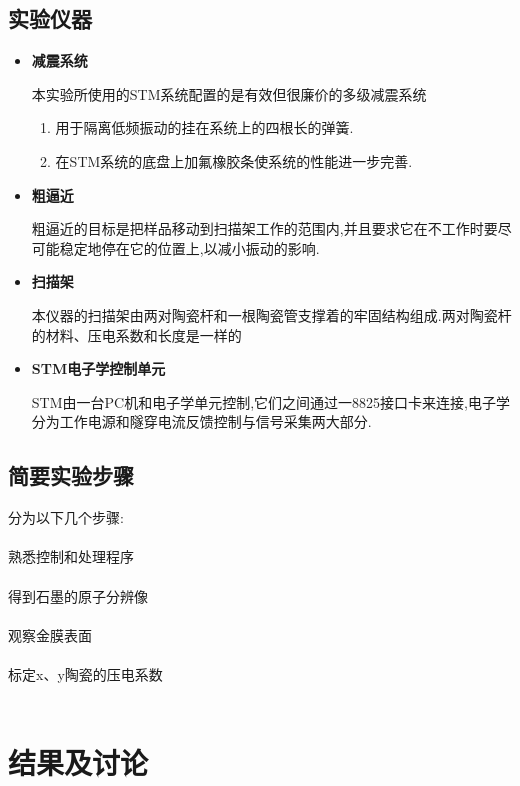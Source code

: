 \documentclass[a4paper]{article}
\begin{document}
\subsection{实验仪器}\label{sub:instruments}
\begin{itemize}
\item{\textbf{减震系统}}

本实验所使用的STM系统配置的是有效但很廉价的多级减震系统
\begin{enumerate}[(1)]
    \item 用于隔离低频振动的挂在系统上的四根长的弹簧.
    \item 在STM系统的底盘上加氟橡胶条使系统的性能进一步完善.
\end{enumerate}
\item{\textbf{粗逼近}}

粗逼近的目标是把样品移动到扫描架工作的范围内,并且要求它在不工作时要尽可能稳定地停在它的位置上,以减小振动的影响.
\item{\textbf{扫描架}}

本仪器的扫描架由两对陶瓷杆和一根陶瓷管支撑着的牢固结构组成.两对陶瓷杆的材料、压电系数和长度是一样的
\item{\textbf{STM电子学控制单元}}

STM由一台PC机和电子学单元控制,它们之间通过一8825接口卡来连接,电子学分为工作电源和隧穿电流反馈控制与信号采集两大部分.

\end{itemize}

\subsection{简要实验步骤}\label{sub:ExperimentalSteps}
分为以下几个步骤:\\\\
熟悉控制和处理程序\\\\
得到石墨的原子分辨像\\\\
观察金膜表面\\\\
标定x、y陶瓷的压电系数\\\\

\newpage
\section{结果及讨论}
\end{document}
